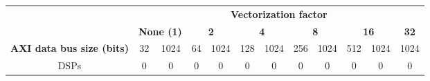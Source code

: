\begin{tabular}{|c|c|c|c|c|c|c|c|c|c|c|c|}
\cline{2-12}
\multicolumn{1}{c|}{} & \multicolumn{11}{c|}{\textbf{Vectorization factor}} \\
\cline{2-12}
\multicolumn{1}{c|}{} & \multicolumn{2}{c|}{\textbf{None (1)}} & \multicolumn{2}{c|}{\textbf{2}} & \multicolumn{2}{c|}{\textbf{4}} & \multicolumn{2}{c|}{\textbf{8}} & \multicolumn{2}{c|}{\textbf{16}} & \multicolumn{1}{c|}{\textbf{32}} \\
\hline
\multicolumn{1}{|c|}{\textbf{AXI data bus size (bits)}} & 32 & 1024 & 64 & 1024 & 128 & 1024 & 256 & 1024 & 512 & 1024 & 1024 \\
\hline
\multicolumn{1}{|c|}{DSPs} &  0 & 0 & 0 & 0 & 0 & 0 & 0 & 0 & 0 & 0 & 0 \\
\hline
\end{tabular}
